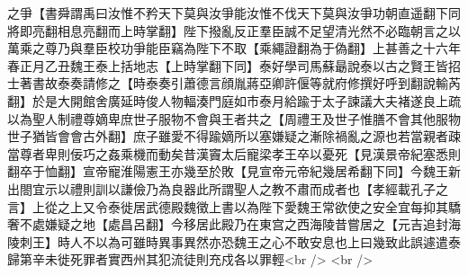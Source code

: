 之爭【書舜謂禹曰汝惟不矜天下莫與汝爭能汝惟不伐天下莫與汝爭功朝直遥翻下同將即亮翻相息亮翻而上時掌翻】陛下撥亂反正羣臣誠不足望清光然不必臨朝言之以萬乘之尊乃與羣臣校功爭能臣竊為陛下不取【乘繩證翻為于偽翻】上甚善之十六年春正月乙丑魏王泰上括地志【上時掌翻下同】泰好學司馬蘇朂說泰以古之賢王皆招士著書故泰奏請修之【時泰奏引蕭德言顔胤蔣亞卿許偃等就府修撰好呼到翻說輸芮翻】於是大開館舍廣延時俊人物輻湊門庭如市泰月給踰于太子諫議大夫褚遂良上疏以為聖人制禮尊嫡卑庶世子服物不會與王者共之【周禮王及世子惟膳不會其他服物世子猶皆會會古外翻】庶子雖愛不得踰嫡所以塞嫌疑之漸除禍亂之源也若當親者疎當尊者卑則佞巧之姦乘機而動矣昔漢竇太后寵梁孝王卒以憂死【見漢景帝紀塞悉則翻卒于恤翻】宣帝寵淮陽憲王亦幾至於敗【見宣帝元帝紀幾居希翻下同】今魏王新出閤宜示以禮則訓以謙儉乃為良器此所謂聖人之教不肅而成者也【孝經載孔子之言】上從之上又令泰徙居武德殿魏徵上書以為陛下愛魏王常欲使之安全宜每抑其驕奢不處嫌疑之地【處昌呂翻】今移居此殿乃在東宫之西海陵昔嘗居之【元吉追封海陵刺王】時人不以為可雖時異事異然亦恐魏王之心不敢安息也上曰幾致此誤遽遣泰歸第辛未徙死罪者實西州其犯流徒則充戍各以罪輕<br />
<br />
